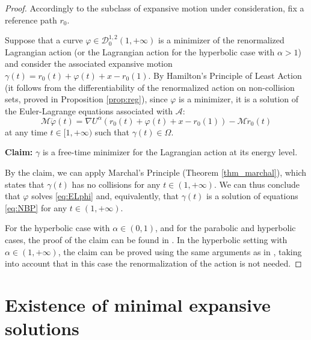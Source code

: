 \documentclass[a4paper,10pt]{amsart}
\theoremstyle{plain}
\theoremstyle{definition}
\numberwithin{equation}{section}
\numberwithin{thm}{section}
\begin{document}
\begin{proof}
    Accordingly to the subclass of expansive motion under consideration, fix a reference path $r_0$.
    
    Suppose that a curve $\varphi\in\mathcal{D}_0^{1,2}(1,+\infty)$ is a minimizer of the renormalized Lagrangian action (or the Lagrangian action for the hyperbolic case with $\alpha>1$) and consider the associated expansive motion $\gamma(t) = r_0(t) + \varphi(t) + x - r_0(1)$.  By Hamilton's Principle of Least Action ({it follows from the differentiability of the renormalized action on non-collision sets, proved in Proposition \ref{prop:reg}}), since $\varphi$ is a minimizer, it is a solution of the Euler-Lagrange equations associated with $ \mathcal{A}$:
    \begin{equation}\label{eq:ELphi}
    \mathcal{M}\ddot{\varphi}(t) = \nabla U^\alpha(r_0(t) + \varphi(t) + x - r_0(1)) - \mathcal{M}\ddot{r}_0(t)
    \end{equation}
    at any time $t\in[1,+\infty)$ such that $\gamma(t)\in\Omega$. 

    \textbf{Claim:} $\gamma$ is a free-time minimizer for the Lagrangian action at its energy level.
    
    By the claim, we can apply Marchal's Principle (Theorem \ref{thm_marchal}), which states that $\gamma(t)$ has no collisions for any $t\in(1,+\infty)$.  {We can thus  conclude that $\varphi$ solves \eqref{eq:ELphi} and, equivalently, that $\gamma(t)$ is a solution of equations \eqref{eq:NBP} for any $t\in(1,+\infty)$.}

    For the hyperbolic case with $\alpha\in(0,1)$, and for the parabolic and hyperbolic cases, the proof of the claim can be found in \cite[Corollary 6.3]{PolimeniTerracini}. In the hyperbolic setting with $\alpha\in(1,+\infty)$, the claim can be proved using the same arguments as in \cite[Corollary 6.3]{PolimeniTerracini}, taking into account that in this case the renormalization of the action is not needed. 


\end{proof}















\section{Existence of minimal expansive solutions}\label{sec:existence}
\end{document}
